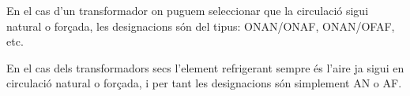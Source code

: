 En el cas d'un transformador on puguem seleccionar que la circulaci\'{o}
sigui natural o for\c{c}ada,
les designacions s\'{o}n del tipus: ONAN/ONAF, ONAN/OFAF, etc.

En el cas dels transformadors secs l'element refrigerant sempre \'{e}s
l'aire ja sigui en circulaci\'{o} natural o for\c{c}ada, i per tant les
designacions s\'{o}n simplement AN o AF.

